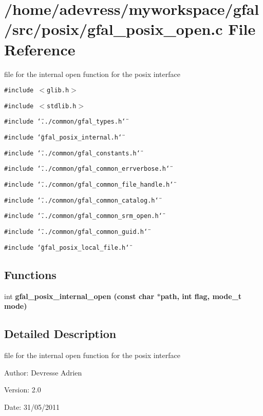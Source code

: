 \section{/home/adevress/myworkspace/gfal/src/posix/gfal\_\-posix\_\-open.c File Reference}
\label{gfal__posix__open_8c}
file for the internal open function for the posix interface 

{\tt \#include $<$glib.h$>$}\par
{\tt \#include $<$stdlib.h$>$}\par
{\tt \#include \char`\"{}../common/gfal\_\-types.h\char`\"{}}\par
{\tt \#include \char`\"{}gfal\_\-posix\_\-internal.h\char`\"{}}\par
{\tt \#include \char`\"{}../common/gfal\_\-constants.h\char`\"{}}\par
{\tt \#include \char`\"{}../common/gfal\_\-common\_\-errverbose.h\char`\"{}}\par
{\tt \#include \char`\"{}../common/gfal\_\-common\_\-file\_\-handle.h\char`\"{}}\par
{\tt \#include \char`\"{}../common/gfal\_\-common\_\-catalog.h\char`\"{}}\par
{\tt \#include \char`\"{}../common/gfal\_\-common\_\-srm\_\-open.h\char`\"{}}\par
{\tt \#include \char`\"{}../common/gfal\_\-common\_\-guid.h\char`\"{}}\par
{\tt \#include \char`\"{}gfal\_\-posix\_\-local\_\-file.h\char`\"{}}\par
\subsection*{Functions}
\begin{CompactItemize}
\item 
int \bf{gfal\_\-posix\_\-internal\_\-open} (const char $\ast$path, int flag, mode\_\-t mode)
\end{CompactItemize}


\subsection{Detailed Description}
file for the internal open function for the posix interface 

\begin{Desc}
\item[Author:]Devresse Adrien \end{Desc}
\begin{Desc}
\item[Version:]2.0 \end{Desc}
\begin{Desc}
\item[Date:]31/05/2011 \end{Desc}


